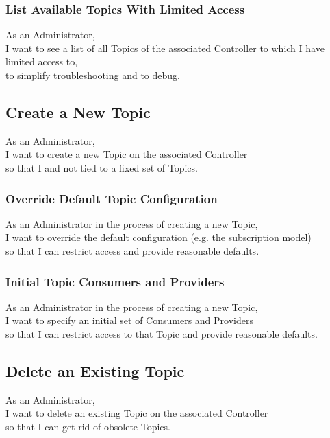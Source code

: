 \subsubsection{List Available Topics With Limited Access}

As an Administrator,\\
I want to see a list of all Topics of the associated Controller to which I have limited access to,\\
to simplify troubleshooting and to debug.

\subsection{Create a New Topic}

As an Administrator,\\
I want to create a new Topic on the associated Controller\\
so that I and not tied to a fixed set of Topics.

\subsubsection{Override Default Topic Configuration}

As an Administrator in the process of creating a new Topic,\\
I want to override the default configuration (e.g. the subscription model) \\
so that I can restrict access and provide reasonable defaults.

\subsubsection{Initial Topic Consumers and Providers}

As an Administrator in the process of creating a new Topic,\\
I want to specify an initial set of Consumers and Providers \\
so that I can restrict access to that Topic and provide reasonable defaults.

\subsection{Delete an Existing Topic}

As an Administrator,\\
I want to delete an existing Topic on the associated Controller\\
so that I can get rid of obsolete Topics.

